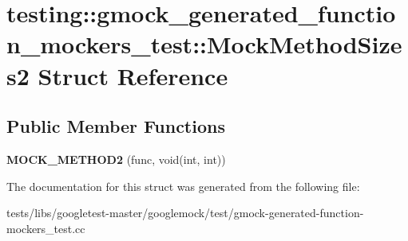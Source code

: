 \hypertarget{structtesting_1_1gmock__generated__function__mockers__test_1_1MockMethodSizes2}{}\section{testing\+:\+:gmock\+\_\+generated\+\_\+function\+\_\+mockers\+\_\+test\+:\+:Mock\+Method\+Sizes2 Struct Reference}
\label{structtesting_1_1gmock__generated__function__mockers__test_1_1MockMethodSizes2}
\subsection*{Public Member Functions}
\begin{DoxyCompactItemize}
\item 
\mbox{\label{structtesting_1_1gmock__generated__function__mockers__test_1_1MockMethodSizes2_a9200d3c0d5cbabb2bb93da4827b84260}} 
{\bfseries M\+O\+C\+K\+\_\+\+M\+E\+T\+H\+O\+D2} (func, void(int, int))
\end{DoxyCompactItemize}


The documentation for this struct was generated from the following file\+:\begin{DoxyCompactItemize}
\item 
tests/libs/googletest-\/master/googlemock/test/gmock-\/generated-\/function-\/mockers\+\_\+test.\+cc\end{DoxyCompactItemize}
